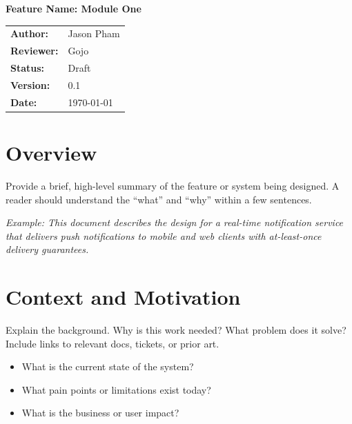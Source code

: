\documentclass[11pt, a4paper]{article}
\newcommand{\doctitle}{Feature Name: Module One}
\newcommand{\docauthor}{Jason Pham}
\newcommand{\docreviewer}{Gojo}
\newcommand{\docstatus}{Draft}           %
\newcommand{\docversion}{0.1}
\begin{document}
\begin{center}
    {\LARGE\bfseries \doctitle \par}
    \vspace{1em}
    \begin{tabular}{@{} l l @{}}
        \textbf{Author:}   & \docauthor \\
        \textbf{Reviewer:} & \docreviewer \\
        \textbf{Status:}   & \docstatus \\
        \textbf{Version:}  & \docversion \\
        \textbf{Date:}     & \today \\
    \end{tabular}
\end{center}

\vspace{1em}
\tableofcontents
\newpage

\section{Overview}

Provide a brief, high-level summary of the feature or system being designed. A reader should understand the ``what'' and ``why'' within a few sentences.

\textit{Example: This document describes the design for a real-time notification service that delivers push notifications to mobile and web clients with at-least-once delivery guarantees.}

\section{Context and Motivation}

Explain the background. Why is this work needed? What problem does it solve? Include links to relevant docs, tickets, or prior art.

\begin{itemize}
    \item What is the current state of the system?
    \item What pain points or limitations exist today?
    \item What is the business or user impact?
\end{itemize}
\end{document}
